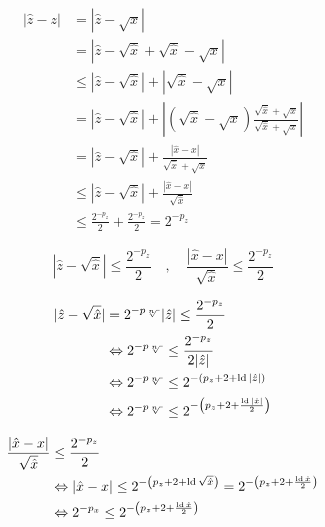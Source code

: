 \begin{equation*}
\begin{split}
  |\hat{z}-z| & =  |\hat{z}-\sqrt{x}| \\
              & =  |\hat{z}-\sqrt{\hat{x}}+\sqrt{\hat{x}}-\sqrt{x}| \\
              &\le |\hat{z}-\sqrt{\hat{x}}|+|\sqrt{\hat{x}}-\sqrt{x}| \\
              & =  |\hat{z}-\sqrt{\hat{x}}|
			       +\left|\left(\sqrt{\hat{x}}-\sqrt{x}\right)
				    \frac{\sqrt{\hat{x}}+\sqrt{x}}{\sqrt{\hat{x}}+\sqrt{x}}\right| \\
              & =  |\hat{z}-\sqrt{\hat{x}}|+\frac{|\hat{x}-x|}{\sqrt{\hat{x}}+\sqrt{x}} \\
              &\le |\hat{z}-\sqrt{\hat{x}}|+\frac{|\hat{x}-x|}{\sqrt{\hat{x}}} \\
              &\le \frac{2^{-p_z}}{2}+\frac{2^{-p_z}}{2}=2^{-p_z}
\end{split}
\end{equation*}

\begin{equation*}
  |\hat{z}-\sqrt{\hat{x}}|           \le \frac{2^{-p_z}}{2}
  \quad,\quad
  \frac{|\hat{x}-x|}{\sqrt{\hat{x}}} \le \frac{2^{-p_z}}{2}
\end{equation*}

\begin{equation*}
\begin{split}
  |\hat{z}-\sqrt{\hat{x}}| & = 2^{-p_\op}|\hat{z}| \le \frac{2^{-p_z}}{2} \\
& \Leftrightarrow
  2^{-p_\op} \le \frac{2^{-p_z}}{2|\hat{z}|} \\
& \Leftrightarrow
  2^{-p_\op}\le 2^{-(p_z+2+\ld|\hat{z}|)} \\
& \Leftrightarrow
  2^{-p_\op}\le 2^{-\left(p_z+2+\frac{\ld|\hat{x}|}{2}\right)}
\end{split} 
\end{equation*}

\begin{equation*}
\begin{split}
  \frac{|\hat{x}-x|}{\sqrt{\hat{x}}} & \le \frac{2^{-p_z}}{2} \\
& \Leftrightarrow
  |\hat{x}-x| \le 2^{-\left(p_z+2+\mathop{\rm ld}\nolimits\sqrt{\hat{x}}\right)}
               =  2^{-\left(p_z+2+\frac{\mathop{\rm ld}\nolimits\hat{x}}{2}\right)} \\
& \Leftrightarrow
   2^{-p_x}  \le  2^{-\left(p_z+2+\frac{\mathop{\rm ld}\nolimits\hat{x}}{2}\right)}
\end{split} 
\end{equation*}

